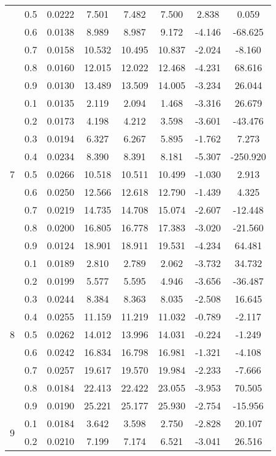 \documentclass[11pt,a4paper]{report}
\begin{document}
\begin{longtable}{ | c | c || c | c | c | c | c | c | }
 & 0.5 & 0.0222 & 7.501 & 7.482 & 7.500 & 2.838 & 0.059 \\
 & 0.6 & 0.0138 & 8.989 & 8.987 & 9.172 & -4.146 & -68.625 \\
 & 0.7 & 0.0158 & 10.532 & 10.495 & 10.837 & -2.024 & -8.160 \\
 & 0.8 & 0.0160 & 12.015 & 12.022 & 12.468 & -4.231 & 68.616 \\
 & 0.9 & 0.0130 & 13.489 & 13.509 & 14.005 & -3.234 & 26.044 \\
 \hline
\multirow{9}{*}{7} & 0.1 & 0.0135 & 2.119 & 2.094 & 1.468 & -3.316 & 26.679 \\
 & 0.2 & 0.0173 & 4.198 & 4.212 & 3.598 & -3.601 & -43.476 \\
 & 0.3 & 0.0194 & 6.327 & 6.267 & 5.895 & -1.762 & 7.273 \\
 & 0.4 & 0.0234 & 8.390 & 8.391 & 8.181 & -5.307 & -250.920 \\
 & 0.5 & 0.0266 & 10.518 & 10.511 & 10.499 & -1.030 & 2.913 \\
 & 0.6 & 0.0250 & 12.566 & 12.618 & 12.790 & -1.439 & 4.325 \\
 & 0.7 & 0.0219 & 14.735 & 14.708 & 15.074 & -2.607 & -12.448 \\
 & 0.8 & 0.0200 & 16.805 & 16.778 & 17.383 & -3.020 & -21.560 \\
 & 0.9 & 0.0124 & 18.901 & 18.911 & 19.531 & -4.234 & 64.481 \\
 \hline
\multirow{9}{*}{8} & 0.1 & 0.0189 & 2.810 & 2.789 & 2.062 & -3.732 & 34.732 \\
 & 0.2 & 0.0199 & 5.577 & 5.595 & 4.946 & -3.656 & -36.487 \\
 & 0.3 & 0.0244 & 8.384 & 8.363 & 8.035 & -2.508 & 16.645 \\
 & 0.4 & 0.0255 & 11.159 & 11.219 & 11.032 & -0.789 & -2.117 \\
 & 0.5 & 0.0262 & 14.012 & 13.996 & 14.031 & -0.224 & -1.249 \\
 & 0.6 & 0.0242 & 16.834 & 16.798 & 16.981 & -1.321 & -4.108 \\
 & 0.7 & 0.0257 & 19.617 & 19.570 & 19.984 & -2.233 & -7.666 \\
 & 0.8 & 0.0184 & 22.413 & 22.422 & 23.055 & -3.953 & 70.505 \\
 & 0.9 & 0.0190 & 25.221 & 25.177 & 25.930 & -2.754 & -15.956 \\
 \hline
\multirow{9}{*}{9} & 0.1 & 0.0184 & 3.642 & 3.598 & 2.750 & -2.828 & 20.107 \\
 & 0.2 & 0.0210 & 7.199 & 7.174 & 6.521 & -3.041 & 26.516 \\

\end{longtable}
\end{document}
